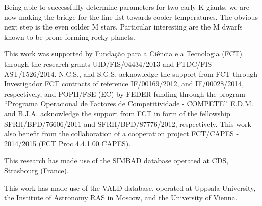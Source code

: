 \documentclass{aa}
\begin{document}
Being able to successfully determine parameters for two early K giants, we are
now making the bridge for the line list towards cooler temperatures. The obvious
next step is the even colder M stars. Particular interesting are the M dwarfs
known to be prone forming rocky planets.





\begin{acknowledgements}
  This work was supported by Funda\c{c}\~ao para a Ci\^encia e a
  Tecnologia (FCT) through the research grants UID/FIS/04434/2013 and
  PTDC/FIS-AST/1526/2014. N.C.S., and S.G.S. acknowledge the support from
  FCT through Investigador FCT contracts of reference IF/00169/2012, and
  IF/00028/2014, respectively, and POPH/FSE (EC) by FEDER funding through
  the program “Programa Operacional de Factores de Competitividade
  - COMPETE”. E.D.M. and B.J.A. acknowledge the support from FCT in
  form of the fellowship SFRH/BPD/76606/2011 and SFRH/BPD/87776/2012,
  respectively. This work also benefit from the collaboration of a
  cooperation project FCT/CAPES - 2014/2015 (FCT Proc 4.4.1.00 CAPES).

  This research has made use of the SIMBAD database operated at CDS,
  Strasbourg (France).

  This work has made use of the VALD database, operated at Uppsala
  University, the Institute of Astronomy RAS in Moscow, and the University
  of Vienna.
\end{acknowledgements}




\end{document}
